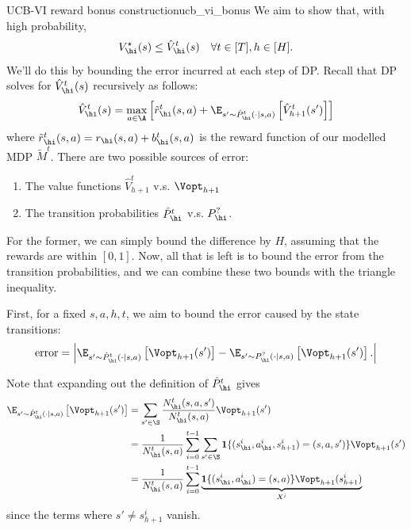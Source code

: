 \documentclass[\main/main]{subfiles}
\begin{document}
\begin{derivation}{UCB-VI reward bonus construction}{ucb_vi_bonus}
    We aim to show that, with high probability, \[
        V_\hi^\star(s) \le \hat{V}_\hi^t(s) \quad \forall t \in [T], h \in [H].
    \]
    We'll do this by bounding the error incurred at each step of DP. Recall that DP solves for $\hat{V}_\hi^t(s)$ recursively as follows:
    \[
        \hat{V}_\hi^t(s) = \max_{a \in \A} \left[ \tilde r^t_\hi(s, a) + \E_{s' \sim \hat{P}_\hi^t(\cdot \mid s, a)} \left[ \hat{V}_{h+1}^t(s') \right] \right]
    \]
    where $\tilde r^t_\hi(s, a) = r_\hi(s, a) + b_\hi^t(s, a)$ is the reward function of our modelled MDP $\tilde{M}^t$.
    There are two possible sources of error:
    \begin{enumerate}
        \item The value functions $\hat{V}^t_{h+1}$ v.s. $\Vopt_{h+1}$
        \item The transition probabilities $\hat{P}_\hi^t$ v.s. $P^?_\hi$.
    \end{enumerate}
    For the former, we can simply bound the difference by $H$, assuming that the rewards are within $[0, 1]$. Now, all that is left is to bound the error from the transition probabilities, and we can combine these two bounds with the triangle inequality.
    
    First, for a fixed $s, a, h, t$, we aim to bound the error caused by the state transitions:
    \begin{equation}
        \text{error} = \left| \E_{s' \sim \hat{P}_\hi^t(\cdot \mid s, a)} \left[ \Vopt_{h+1}(s') \right] - \E_{s' \sim P^?_\hi(\cdot \mid s, a)} \left[ \Vopt_{h+1}(s') \right]. \right|
        \label{eq:err}
    \end{equation}

    Note that expanding out the definition of $\hat{P}_\hi^t$ gives
    \begin{align*}
        \E_{s' \sim \hat{P}_\hi^t(\cdot \mid s, a)} \left[ \Vopt_{h+1}(s') \right] &= \sum_{s' \in \S} \frac{N^t_\hi(s, a, s')}{N^t_\hi(s, a)} \Vopt_{h+1}(s') \\
        &= \frac{1}{N^t_\hi(s, a)} \sum_{i=0}^{t-1} \sum_{s' \in \S} \mathbf{1}\{ (s_\hi^i, a_\hi^i, s_{h+1}^i) = (s, a, s') \} \Vopt_{h+1}(s') \\
        &= \frac{1}{N^t_\hi(s, a)} \sum_{i=0}^{t-1} \underbrace{\mathbf{1}\{ (s_\hi^i, a_\hi^i) = (s, a) \} \Vopt_{h+1}(s_{h+1}^i)}_{X^i}
    \end{align*}
    since the terms where $s' \neq s_{h+1}^i$ vanish.


\end{derivation}
\end{document}

